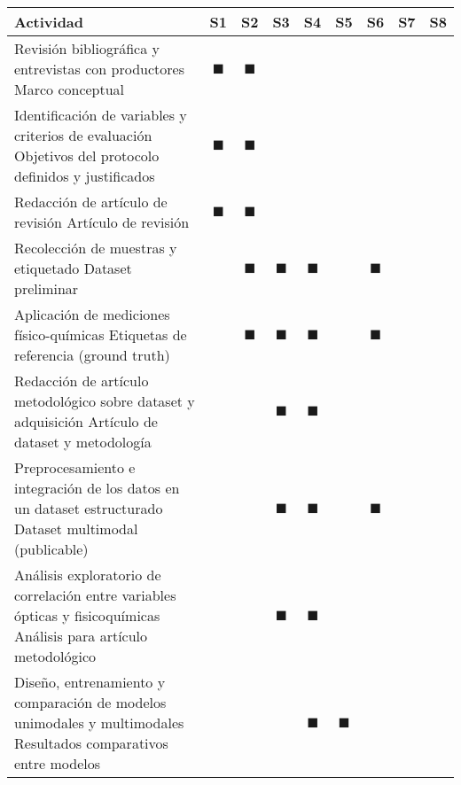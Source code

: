\begin{landscape}
\begin{table}[h]
\centering
\scriptsize
\begin{tabular}{|p{10cm}|c|c|c|c|c|c|c|c|}
\hline
\textbf{Actividad} & \textbf{S1} & \textbf{S2} & \textbf{S3} & \textbf{S4} & \textbf{S5} & \textbf{S6} & \textbf{S7} & \textbf{S8} \\
\hline
Revisión bibliográfica y entrevistas con productores \newline [OE1] Marco conceptual & $\blacksquare$ & $\blacksquare$ &  &  &  &  &  &  \\
\hline
Identificación de variables y criterios de evaluación \newline [OE1] Objetivos del protocolo definidos y justificados & $\blacksquare$ & $\blacksquare$ &  &  &  &  &  &  \\
\hline
Redacción de artículo de revisión \newline [OE1] Artículo de revisión & $\blacksquare$ & $\blacksquare$ &  &  &  &  &  &  \\
\hline
Recolección de muestras y etiquetado \newline [OE2] Dataset preliminar &  & $\blacksquare$ & $\blacksquare$ & $\blacksquare$ &  & $\blacksquare$ &  &  \\
\hline
Aplicación de mediciones físico-químicas \newline [OE2] Etiquetas de referencia (ground truth) &  & $\blacksquare$ & $\blacksquare$ & $\blacksquare$ &  & $\blacksquare$ &  &  \\
\hline
Redacción de artículo metodológico sobre dataset y adquisición \newline [OE2, OE3] Artículo de dataset y metodología &  &  & $\blacksquare$ & $\blacksquare$ &  &  &  &  \\
\hline
Preprocesamiento e integración de los datos en un dataset estructurado \newline [OE2, OE3] Dataset multimodal (publicable) &  &  & $\blacksquare$ & $\blacksquare$ &  & $\blacksquare$ &  &  \\
\hline
Análisis exploratorio de correlación entre variables ópticas y fisicoquímicas \newline [OE2] Análisis para artículo metodológico &  &  & $\blacksquare$ & $\blacksquare$ &  &  &  &  \\
\hline
Diseño, entrenamiento y comparación de modelos unimodales y multimodales \newline [OE3, OE4] Resultados comparativos entre modelos &  &  &  & $\blacksquare$ & $\blacksquare$ &  &  &  \\

\end{tabular}
\end{table}
\end{landscape}
